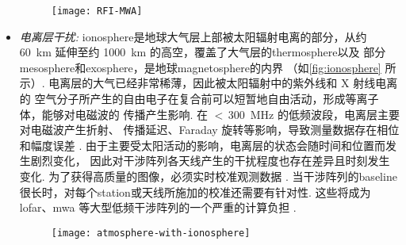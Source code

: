 \begin{itemize}
\begin{figure}[htp]
  \centering
  \texttt{[image: RFI-MWA]}
  \label{fig:rfi-mwa}
\end{figure}

\item
\emph{电离层干扰:}
\acf{ionosphere}是地球大气层上部被太阳辐射电离的部分，从约 \SI{60}{\km}
延伸至约 \SI{1000}{\km} 的高空，覆盖了大气层的\ac{thermosphere}以及
部分\ac{mesosphere}和\ac{exosphere}，是地球\ac{magnetosphere}的内界
（如\autoref{fig:ionosphere} 所示）.
电离层的大气已经非常稀薄，因此被太阳辐射中的紫外线和 X 射线电离的
空气分子所产生的自由电子在复合前可以短暂地自由活动，形成等离子体，能够对电磁波的
传播产生影响.
在 $<$\,\SI{300}{\MHz} 的低频波段，电离层主要对电磁波产生折射、
传播延迟、Faraday 旋转等影响，导致测量数据存在相位和幅度误差
\cite{intema2009,thompson2017}.
由于主要受太阳活动的影响，电离层的状态会随时间和位置而发生剧烈变化，
因此对干涉阵列各天线产生的干扰程度也存在差异且时刻发生变化.
为了获得高质量的图像，必须实时校准观测数据 \cite{intema2009,jordan2017}.
当干涉阵列的\ac{baseline}很长时，对每个\ac{station}或天线所施加的校准还需要有针对性.
这些将成为 \ac{lofar}、\ac{mwa} 等大型低频干涉阵列的一个严重的计算负担
\cite{intema2009,deGasperin2018}.

\begin{figure}[htp]
  \centering
  \texttt{[image: atmosphere-with-ionosphere]}
  \label{fig:ionosphere}
\end{figure}


\end{itemize}
